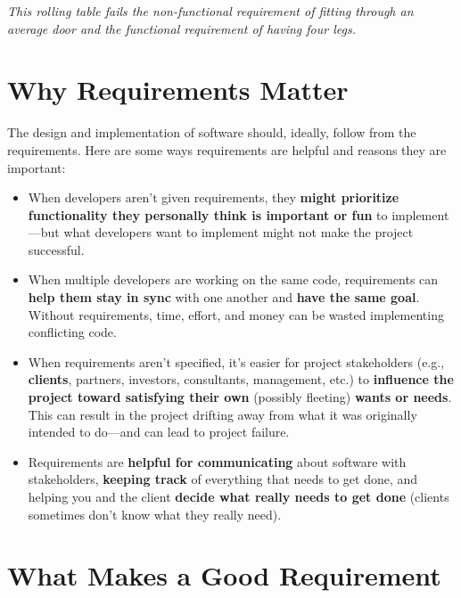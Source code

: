\textit{This rolling table fails the non-functional requirement of fitting through an average door and the functional requirement of having four legs.}

\section{Why Requirements Matter}

The design and implementation of software should, ideally, follow from the requirements. Here are some ways requirements are helpful and reasons they are important:

\begin{itemize}
\item When developers aren't given requirements, they \textbf{might prioritize functionality they personally think is important or fun} to implement---but what developers want to implement might not make the project successful.
\item When multiple developers are working on the same code, requirements can \textbf{help them stay in sync} with one another and \textbf{have the same goal}. Without requirements, time, effort, and money can be wasted implementing conflicting code.
\item When requirements aren't specified, it's easier for project stakeholders (e.g., \textbf{clients}, partners, investors, consultants, management, etc.) to \textbf{influence the project toward satisfying their own} (possibly fleeting) \textbf{wants or needs}. This can result in the project drifting away from what it was originally intended to do---and can lead to project failure.
\item Requirements are \textbf{helpful for communicating} about software with stakeholders, \textbf{keeping track} of everything that needs to get done, and helping you and the client \textbf{decide what really needs to get done} (clients sometimes don't know what they really need).
\end{itemize}\marginpar{\clientDef\margindivider}

\section{What Makes a Good Requirement}

